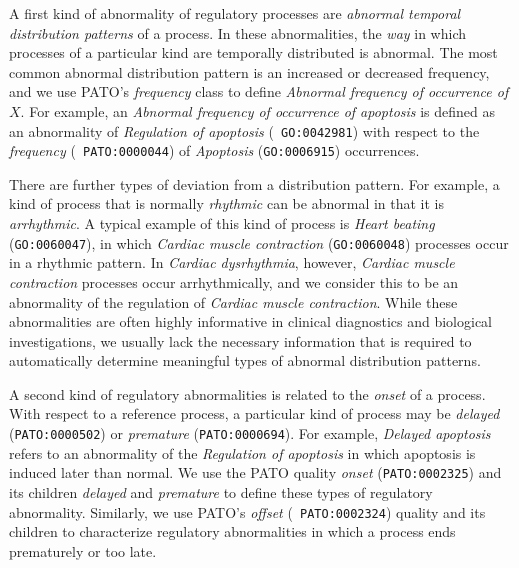 \documentclass{bioinfo}
\begin{document}
A first kind of abnormality of regulatory processes are {\em abnormal
  temporal distribution patterns} of a process. In these
abnormalities, the {\em way} in which processes of a particular kind
are temporally distributed is abnormal.  The most common abnormal
distribution pattern is an increased or decreased frequency, and we
use PATO's {\em frequency} class to define {\em Abnormal frequency of
  occurrence of $X$}.
For example, an {\em Abnormal frequency of occurrence of apoptosis} is
defined as an abnormality of {\em Regulation of apoptosis} ({\tt
  GO:0042981}) with respect to the {\em frequency} ({\tt
  PATO:0000044}) of {\em Apoptosis} ({\tt GO:0006915}) occurrences.

There are further types of deviation from a distribution pattern. For
example, a kind of process that is normally {\em rhythmic} can be
abnormal in that it is {\em arrhythmic}. A typical example of this
kind of process is {\em Heart beating} ({\tt GO:0060047}), in which
{\em Cardiac muscle contraction} ({\tt GO:0060048}) processes occur in
a rhythmic pattern. In {\em Cardiac dysrhythmia}, however, {\em
  Cardiac muscle contraction} processes occur arrhythmically, and we
consider this to be an abnormality of the regulation of {\em Cardiac
  muscle contraction}. While these abnormalities are often highly
informative in clinical diagnostics and biological investigations, we
usually lack the necessary information that is required to
automatically determine meaningful types of abnormal distribution
patterns.

A second kind of regulatory abnormalities is related to the {\em
  onset} of a process. With respect to a reference process, a
particular kind of process may be {\em delayed} ({\tt PATO:0000502})
or {\em premature} ({\tt PATO:0000694}). For example, {\em Delayed
  apoptosis} refers to an abnormality of the {\em Regulation of
  apoptosis} in which apoptosis is induced later than normal.  We use
the PATO quality {\em onset} ({\tt PATO:0002325}) and its children
{\em delayed} and {\em premature} to define these types of regulatory
abnormality. Similarly, we use PATO's {\em offset} ({\tt
  PATO:0002324}) quality and its children to characterize regulatory
abnormalities in which a process ends prematurely or too late.
\end{document}
